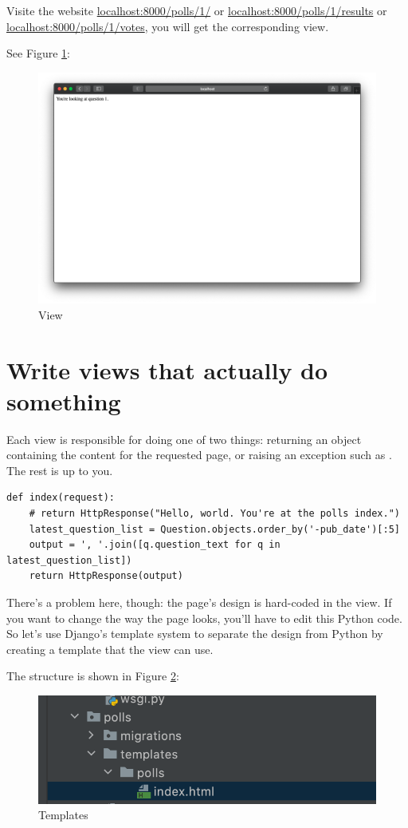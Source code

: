Visite the website \url{localhost:8000/polls/1/} or \url{localhost:8000/polls/1/results} or \url{localhost:8000/polls/1/votes}, you will get the corresponding view.

See Figure \ref{fig:view}:
\begin{figure}[!ht]
  \centering
  \includegraphics[width=\textwidth]{view.png}
  \caption{View}
  \label{fig:view}
\end{figure}


\section{Write views that actually do something}

Each view is responsible for doing one of two things: returning an  object containing the content for the requested page, or raising an exception such as .
The rest is up to you.


\begin{lstlisting}
def index(request):
    # return HttpResponse("Hello, world. You're at the polls index.")
    latest_question_list = Question.objects.order_by('-pub_date')[:5]
    output = ', '.join([q.question_text for q in latest_question_list])
    return HttpResponse(output)
\end{lstlisting}

There’s a problem here, though: the page’s design is hard-coded in the view.
If you want to change the way the page looks, you’ll have to edit this Python code.
So let’s use Django’s template system to separate the design from Python by creating a template that the view can use.

The structure is shown in Figure \ref{fig:templates}:
\begin{figure}[!ht]
  \centering
  \includegraphics[width=\textwidth]{templates.png}
  \caption{Templates}
  \label{fig:templates}
\end{figure}


